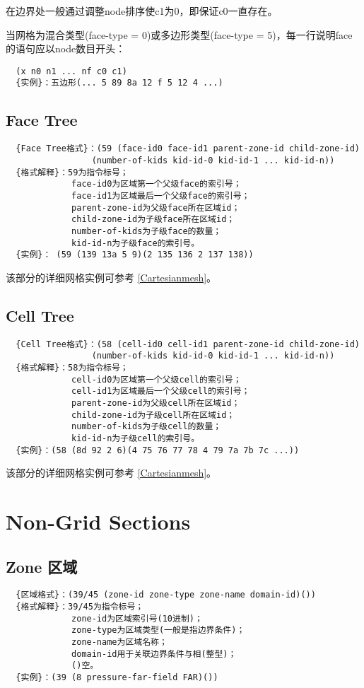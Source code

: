 \documentclass[lang=cn,11pt,a4paper]{elegantpaper} %
\begin{document}
在边界处一般通过调整node排序使c1为0，即保证c0一直存在。

当网格为混合类型(face-type = 0)或多边形类型(face-type = 5)，每一行说明face的语句应以node数目开头：
\begin{lstlisting}
  (x n0 n1 ... nf c0 c1) 
  {实例}：五边形(... 5 89 8a 12 f 5 12 4 ...) 
\end{lstlisting}

\subsection{Face Tree}\label{Face-Tree}
\begin{lstlisting}
  {Face Tree格式}：(59 (face-id0 face-id1 parent-zone-id child-zone-id)
                 (number-of-kids kid-id-0 kid-id-1 ... kid-id-n))
  {格式解释}：59为指令标号；
             face-id0为区域第一个父级face的索引号；
             face-id1为区域最后一个父级face的索引号；
             parent-zone-id为父级face所在区域id；
             child-zone-id为子级face所在区域id；
             number-of-kids为子级face的数量；
             kid-id-n为子级face的索引号。
  {实例}： (59 (139 13a 5 9)(2 135 136 2 137 138))
\end{lstlisting}
该部分的详细网格实例可参考 \ref{Cartesianmesh}。

\subsection{Cell Tree}\label{Cell-Tree}
\begin{lstlisting}
  {Cell Tree格式}：(58 (cell-id0 cell-id1 parent-zone-id child-zone-id)
                 (number-of-kids kid-id-0 kid-id-1 ... kid-id-n))
  {格式解释}：58为指令标号；
             cell-id0为区域第一个父级cell的索引号；
             cell-id1为区域最后一个父级cell的索引号；
             parent-zone-id为父级cell所在区域id；
             child-zone-id为子级cell所在区域id；
             number-of-kids为子级cell的数量；
             kid-id-n为子级cell的索引号。
  {实例}：(58 (8d 92 2 6)(4 75 76 77 78 4 79 7a 7b 7c ...))            
\end{lstlisting}
该部分的详细网格实例可参考 \ref{Cartesianmesh}。


\section{Non-Grid Sections}\label{NonGridSections}

\subsection{Zone 区域}\label{Zone}
\begin{lstlisting}
  {区域格式}：(39/45 (zone-id zone-type zone-name domain-id)())
  {格式解释}：39/45为指令标号；
             zone-id为区域索引号(10进制)；
             zone-type为区域类型(一般是指边界条件)；
             zone-name为区域名称；
             domain-id用于关联边界条件与相(整型)；
             ()空。
  {实例}：(39 (8 pressure-far-field FAR)())
\end{lstlisting}
\end{document}
